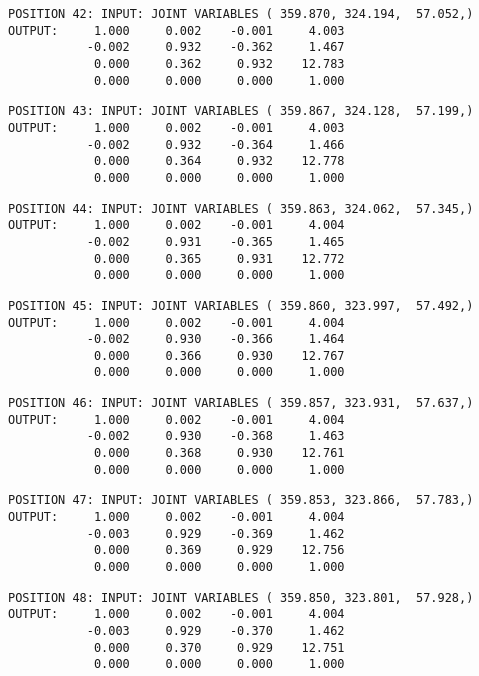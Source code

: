\begin{verbatim}
POSITION 42: INPUT: JOINT VARIABLES ( 359.870, 324.194,  57.052,)
OUTPUT:     1.000     0.002    -0.001     4.003
           -0.002     0.932    -0.362     1.467
            0.000     0.362     0.932    12.783
            0.000     0.000     0.000     1.000
\end{verbatim} \pagebreak[1]\begin{verbatim}
POSITION 43: INPUT: JOINT VARIABLES ( 359.867, 324.128,  57.199,)
OUTPUT:     1.000     0.002    -0.001     4.003
           -0.002     0.932    -0.364     1.466
            0.000     0.364     0.932    12.778
            0.000     0.000     0.000     1.000
\end{verbatim} \pagebreak[1]\begin{verbatim}
POSITION 44: INPUT: JOINT VARIABLES ( 359.863, 324.062,  57.345,)
OUTPUT:     1.000     0.002    -0.001     4.004
           -0.002     0.931    -0.365     1.465
            0.000     0.365     0.931    12.772
            0.000     0.000     0.000     1.000
\end{verbatim} \pagebreak[1]\begin{verbatim}
POSITION 45: INPUT: JOINT VARIABLES ( 359.860, 323.997,  57.492,)
OUTPUT:     1.000     0.002    -0.001     4.004
           -0.002     0.930    -0.366     1.464
            0.000     0.366     0.930    12.767
            0.000     0.000     0.000     1.000
\end{verbatim} \pagebreak[1]\begin{verbatim}
POSITION 46: INPUT: JOINT VARIABLES ( 359.857, 323.931,  57.637,)
OUTPUT:     1.000     0.002    -0.001     4.004
           -0.002     0.930    -0.368     1.463
            0.000     0.368     0.930    12.761
            0.000     0.000     0.000     1.000
\end{verbatim} \pagebreak[1]\begin{verbatim}
POSITION 47: INPUT: JOINT VARIABLES ( 359.853, 323.866,  57.783,)
OUTPUT:     1.000     0.002    -0.001     4.004
           -0.003     0.929    -0.369     1.462
            0.000     0.369     0.929    12.756
            0.000     0.000     0.000     1.000
\end{verbatim} \pagebreak[1]\begin{verbatim}
POSITION 48: INPUT: JOINT VARIABLES ( 359.850, 323.801,  57.928,)
OUTPUT:     1.000     0.002    -0.001     4.004
           -0.003     0.929    -0.370     1.462
            0.000     0.370     0.929    12.751
            0.000     0.000     0.000     1.000
\end{verbatim} \pagebreak[1]\begin{verbatim}

\end{verbatim}
